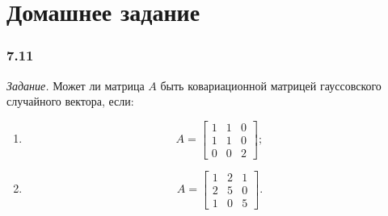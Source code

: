 \section*{Домашнее задание}

\subsubsection*{7.11}

\textit{Задание.}
Может ли матрица $A$ быть ковариационной матрицей гауссовского случайного вектора, если:
\begin{enumerate}[label=\alph*)]
  \item $$A =
    \begin{bmatrix}
      1 & 1 & 0 \\
      1 & 1 & 0 \\
      0 & 0 & 2
    \end{bmatrix};$$
  \item $$A =
    \begin{bmatrix}
      1 & 2 & 1 \\
      2 & 5 & 0 \\
      1 & 0 & 5
    \end{bmatrix}.$$
\end{enumerate}

